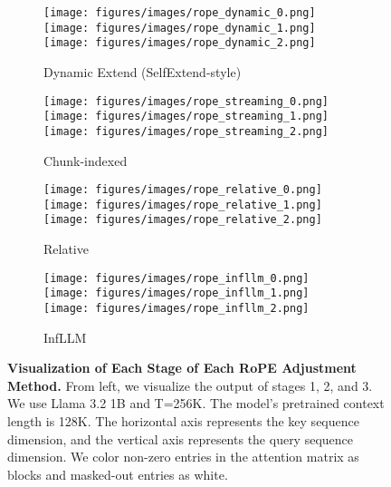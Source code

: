 \begin{figure}[h]
\centering

\begin{subfigure}[b]{0.5\linewidth}
\centering
\texttt{[image: figures/images/rope\_dynamic\_0.png]}%
\texttt{[image: figures/images/rope\_dynamic\_1.png]}%
\texttt{[image: figures/images/rope\_dynamic\_2.png]}%
\caption{Dynamic Extend (SelfExtend-style)}
\end{subfigure}%
\begin{subfigure}[b]{0.5\linewidth}
\centering
\texttt{[image: figures/images/rope\_streaming\_0.png]}%
\texttt{[image: figures/images/rope\_streaming\_1.png]}%
\texttt{[image: figures/images/rope\_streaming\_2.png]}%
\caption{Chunk-indexed}
\end{subfigure}%

\begin{subfigure}[b]{0.5\linewidth}
\centering
\texttt{[image: figures/images/rope\_relative\_0.png]}%
\texttt{[image: figures/images/rope\_relative\_1.png]}%
\texttt{[image: figures/images/rope\_relative\_2.png]}%
\caption{Relative}
\end{subfigure}%
\begin{subfigure}[b]{0.5\linewidth}
\centering
\texttt{[image: figures/images/rope\_infllm\_0.png]}%
\texttt{[image: figures/images/rope\_infllm\_1.png]}%
\texttt{[image: figures/images/rope\_infllm\_2.png]}%
\caption{InfLLM}
\end{subfigure}%

\caption{\textbf{Visualization of Each Stage of Each RoPE Adjustment Method.} From left, we visualize the output of stages 1, 2, and 3. We use Llama 3.2 1B and T=256K. The model's pretrained context length is 128K. The horizontal axis represents the key sequence dimension, and the vertical axis represents the query sequence dimension. We color non-zero entries in the attention matrix as blocks and masked-out entries as white.}
\label{fig:stages}
\end{figure}